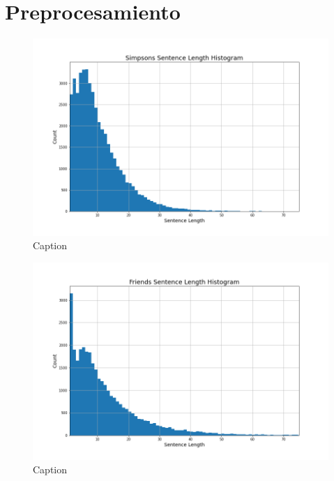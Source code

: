 \section{Preprocesamiento}

\begin{figure}[H]
    \centering
    \includegraphics[width=\textwidth]{results/preprocessing/simpsons_hist.png}
    \caption{Caption}
    \label{fig:simpsons_hist}
\end{figure}

\begin{figure}[H]
    \centering
    \includegraphics[width=\textwidth]{results/preprocessing/friends_hist.png}
    \caption{Caption}
    \label{fig:friends_hist}
\end{figure}